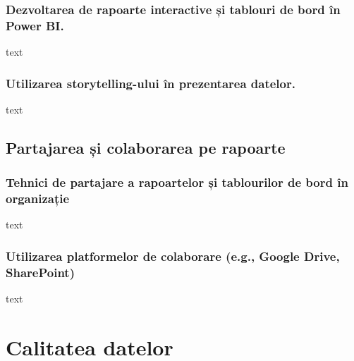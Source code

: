 \documentclass[
  11pt,
  b5paper,
  nottoc]{book}
\begin{document}
\hypertarget{dezvoltarea-de-rapoarte-interactive-ux219i-tablouri-de-bord-uxeen-power-bi.}{%
\subsection{Dezvoltarea de rapoarte interactive și tablouri de bord în
Power
BI.}\label{dezvoltarea-de-rapoarte-interactive-ux219i-tablouri-de-bord-uxeen-power-bi.}}

text

\hypertarget{utilizarea-storytelling-ului-uxeen-prezentarea-datelor.}{%
\subsection{Utilizarea storytelling-ului în prezentarea
datelor.}\label{utilizarea-storytelling-ului-uxeen-prezentarea-datelor.}}

text

\hypertarget{partajarea-ux219i-colaborarea-pe-rapoarte}{%
\section{Partajarea și colaborarea pe
rapoarte}\label{partajarea-ux219i-colaborarea-pe-rapoarte}}

\hypertarget{tehnici-de-partajare-a-rapoartelor-ux219i-tablourilor-de-bord-uxeen-organizaux21bie}{%
\subsection{Tehnici de partajare a rapoartelor și tablourilor de bord în
organizație}\label{tehnici-de-partajare-a-rapoartelor-ux219i-tablourilor-de-bord-uxeen-organizaux21bie}}

text

\hypertarget{utilizarea-platformelor-de-colaborare-e.g.-google-drive-sharepoint}{%
\subsection{Utilizarea platformelor de colaborare (e.g., Google Drive,
SharePoint)}\label{utilizarea-platformelor-de-colaborare-e.g.-google-drive-sharepoint}}

text


\hypertarget{cap7}{%
\chapter{Calitatea datelor}\label{cap7}}
\end{document}
